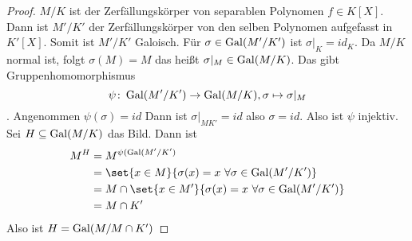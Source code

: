 \begin{proof}
    $M/K$ ist der Zerfällungskörper von separablen Polynomen $f\in K[X]$. Dann ist $M'/K'$ der Zerfällungskörper von den selben Polynomen aufgefasst in $K'[X]$. Somit ist $M'/K'$ Galoisch.
    Für $\sigma\in\operatorname{Gal}(M'/K')$ ist $\sigma|_K=id_K$.
    Da $M/K$ normal ist, folgt $\sigma(M)=M$ das heißt $\sigma|_M\in \operatorname{Gal}(M/K)$. Das gibt Gruppenhomomorphismus
    $$\psi\colon \operatorname{Gal}(M'/K')\to\operatorname{Gal}(M/K),\sigma\mapsto \sigma|_M$$.
    Angenommen $\psi(\sigma)=id$ Dann ist $\sigma|_{MK'}=id$ also $\sigma=id$. Also ist $\psi$ injektiv. Sei $H\subseteq \operatorname{Gal}(M/K)$ das Bild.
    Dann ist 
    \begin{align*}
        M^H&=M^{\psi(\Gal(M'/K')}\\
        &= \set{ x\in M}{ \sigma(x)=x\ \forall\sigma\in\Gal(M'/K')}\\
        &= M\cap\set{ x\in M'}{ \sigma(x)=x\ \forall\sigma\in\Gal(M'/K')}\\
        &= M\cap K'
    \end{align*}
    Also ist $H=\operatorname{Gal}(M/M\cap K')$
\end{proof}
